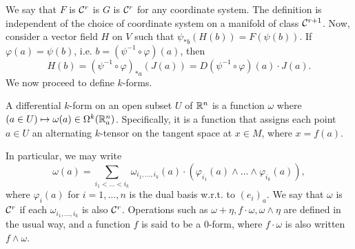 \medskip\newline
We say that $F$ is $\mathcal C^r$ is $G$ is $\mathcal C^r$ for any coordinate system. The definition is independent of the choice of coordinate system on a manifold of class $\mathcal C^{r+1}$. Now, consider a vector field $H$ on $V$ such that $\psi_{\ast b}(H(b)) = F(\psi(b))$. If $\varphi(a) = \psi(b)$, i.e. $b = (\psi^{-1} \circ \varphi)(a)$, then
\[ H(b) = (\psi^{-1} \circ \varphi)_{\ast a}(J(a)) = D(\psi^{-1} \circ \varphi)(a) \cdot J(a). \]
We now proceed to define $k$-forms.
\begin{definition}
    A differential $k$-form on an open subset $U$ of $\mathbb R^n$ is a function $\omega$ where $(a \in U) \mapsto \omega(a) \in \Omega^k(\mathbb R^n_a)$. Specifically, it is a function that assigns each point $a \in U$ an alternating $k$-tensor on the tangent space at $x \in M$, where $x = f(a)$.
\end{definition}
\noindent In particular, we may write
\[ \omega(a) = \sum_{i_1 < \dots < i_k} \omega_{i_1, \dots, i_k}(a) \cdot (\varphi_{i_1}(a) \wedge \dots \wedge \varphi_{i_k}(a)), \]
where $\varphi_i(a)$ for $i = 1, \dots, n$ is the dual basis w.r.t. to $(e_i)_a$. We say that $\omega$ is $\mathcal C^r$ if each $\omega_{i_1, \dots, i_k}$ is also $\mathcal C^r$. Operations such as $\omega + \eta, f \cdot \omega, \omega \wedge \eta$ are defined in the usual way, and a function $f$ is said to be a $0$-form, where $f \cdot \omega$ is also written $f \wedge \omega$.
